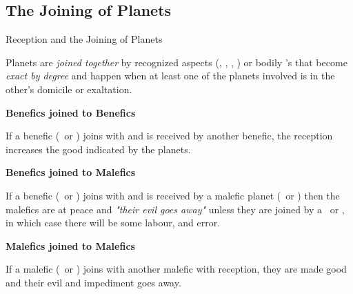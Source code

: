 \subsection{The Joining of Planets}
\begin{frame}[t]{Reception and the Joining of Planets}
\begin{block}{}
 Planets are \textsl{joined together} by recognized aspects (\Sextile, \Square, \Trine, \Opposition) or bodily \Conjunction's that become \textsl{exact by degree} and happen when at least one of the planets involved is in the other's domicile or exaltation.
 \end{block}
\textbf{Benefics joined to Benefics}\footnotemark[1]

If a benefic (\Venus\ or \Jupiter) joins with and is received by another benefic, the reception increases the good indicated by the planets.

\textbf{Benefics joined to Malefics}

If a benefic (\Venus\ or \Jupiter) joins with and is received by a malefic planet (\Mars\ or \Saturn) then the malefics are at peace and \textsl{"their evil goes away"} unless they are joined by a \Square\ or \Opposition, in which case there will be some labour, and error.

\textbf{Malefics joined to Malefics}

If a malefic (\Mars\ or \Saturn) joins with another malefic with reception, they are made good and their evil and impediment goes away.
\vspace{0.5cm}

\end{frame}